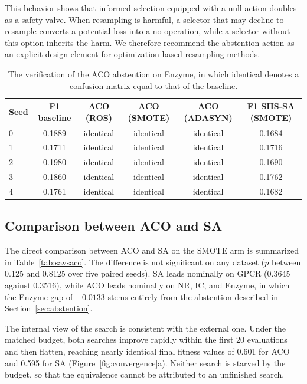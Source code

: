 \documentclass[pdflatex,sn-basic]{sn-jnl}
\begin{document}
This behavior shows that informed selection equipped with a null action
doubles as a safety valve. When resampling is harmful, a selector that
may decline to resample converts a potential loss into a no-operation,
while a selector without this option inherits the harm. We therefore
recommend the abstention action as an explicit design element for
optimization-based resampling methods.

\begin{table}[htbp]
\centering
\caption{The verification of the ACO abstention on Enzyme, in which
identical denotes a confusion matrix equal to that of the baseline.}
\label{tab:abstention}
\footnotesize
\begin{tabular}{lccccc}
\toprule
Seed & F1 baseline & ACO (ROS) & ACO (SMOTE) & ACO (ADASYN) & F1 SHS-SA (SMOTE) \\
\midrule
0 & 0.1889 & identical & identical & identical & 0.1684 \\
1 & 0.1711 & identical & identical & identical & 0.1716 \\
2 & 0.1980 & identical & identical & identical & 0.1690 \\
3 & 0.1860 & identical & identical & identical & 0.1762 \\
4 & 0.1761 & identical & identical & identical & 0.1682 \\
\bottomrule
\end{tabular}
\end{table}

\subsection{Comparison between ACO and SA}
The direct comparison between ACO and SA on the SMOTE arm is summarized
in Table~\ref{tab:savsaco}. The difference is not significant on any
dataset ($p$ between 0.125 and 0.8125 over five paired seeds). SA leads
nominally on GPCR (0.3645 against 0.3516), while ACO leads nominally on
NR, IC, and Enzyme, in which the Enzyme gap of $+0.0133$ stems entirely
from the abstention described in Section~\ref{sec:abstention}.

The internal view of the search is consistent with the external one.
Under the matched budget, both searches improve rapidly within the first
20 evaluations and then flatten, reaching nearly identical final fitness
values of 0.601 for ACO and 0.595 for SA
(Figure~\ref{fig:convergence}a). Neither search is starved by the
budget, so that the equivalence cannot be attributed to an unfinished
search.
\end{document}
